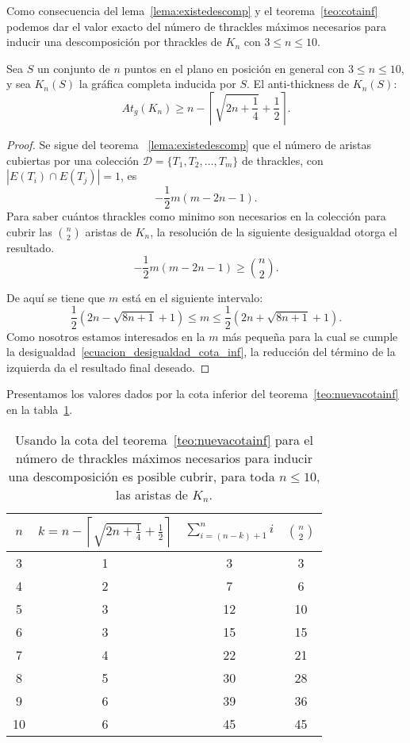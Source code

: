 Como consecuencia del lema~\ref{lema:existedescomp} y el teorema~\ref{teo:cotainf} podemos dar el valor exacto del número de thrackles máximos necesarios para inducir una descomposición por thrackles de $K_n$ con $ 3\leq n \leq 10$.

\begin{theorem}\label{teo:nuevacotainf}
  Sea $S$ un conjunto de $n$ puntos en el plano en posición en general con $3\leq n \leq 10$, y sea $K_n(S)$ la gráfica completa inducida por $S$. El anti-thickness de $K_n(S)$:
  \begin{equation}
    At_g(K_n) \geq n - \left\lceil\sqrt{2n+\frac{1}{4}} + \frac{1}{2}\right\rceil.
    \label{ecuacion_cota_inf}
  \end{equation}
\end{theorem}
\begin{proof}
  Se sigue del teorema ~\ref{lema:existedescomp} que el número de aristas
  cubiertas por una colección $\mathcal{D}=\{T_1,T_2,\dots,T_m\}$ de thrackles, con $|E(T_i)\cap E(T_j)| = 1$, es
  \[ -\frac{1}{2}m(m-2n-1). \]
  Para saber cuántos thrackles como minimo son necesarios en la colección para cubrir las $\binom{n}{2}$ aristas de $K_n$, la resolución de la siguiente desigualdad otorga el resultado.
  \begin{equation}
     -\frac{1}{2}m(m-2n-1) \geq \binom{n}{2}.
     \label{ecuacion_desigualdad_cota_inf}
  \end{equation}

  De aquí se tiene que $m$ está en el siguiente intervalo:
  \[
    \frac{1}{2}\left(2n-\sqrt{8n+1} + 1\right) \leq m \leq  \frac{1}{2}\left(2n+\sqrt{8n+1} + 1\right).
  \]
  Como nosotros estamos interesados en la $m$ más pequeña para la cual se cumple la desigualdad~\ref{ecuacion_desigualdad_cota_inf}, la reducción del
  término de la izquierda da el resultado final deseado.
\end{proof}
Presentamos los valores dados por la cota inferior del
teorema~\ref{teo:nuevacotainf} en la tabla~\ref{table:atnuevacota}.
\begin{table}[t]
  \centering
  \begin{tabular}{|c|c|c|c|}
    \hline
    $n$ & $k=n - \left\lceil\sqrt{2n+\frac{1}{4}} + \frac{1}{2}\right\rceil$ & $\sum^n_{i=(n-k) + 1}i$ & $\binom{n}{2}$\\[5pt] \hline\hline
    3   & 1  & 3 & 3 \\ \hline
    4   & 2  & 7 & 6 \\ \hline
    5   & 3  & 12 & 10 \\ \hline
    6   & 3  & 15 & 15 \\ \hline
    7   & 4  & 22 & 21 \\ \hline
    8   & 5  & 30 & 28 \\ \hline
    9   & 6  & 39 & 36 \\ \hline
    10  & 6  & 45 & 45 \\ \hline
  \end{tabular}
  \caption{Usando la cota del teorema~\ref{teo:nuevacotainf} para el número de
  thrackles máximos necesarios para inducir una descomposición es posible
  cubrir, para toda $n\leq 10$, las aristas de $K_n$.}
  \label{table:atnuevacota}
\end{table}

